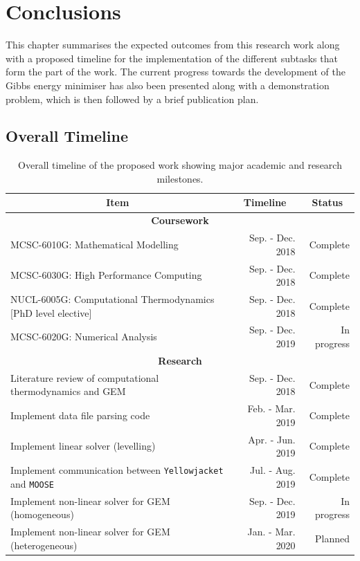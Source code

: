 \chapter{Conclusions} \label{chap:conclusions}


	This chapter summarises the expected outcomes from this research work along with a proposed timeline for the implementation of the different subtasks that form the part of the work. The current progress towards the development of the Gibbs energy minimiser has also been presented along with a demonstration problem, which is then followed by a brief publication plan.


\section{Overall Timeline}
	\begin{table}[!htbp]
		\caption{Overall timeline of the proposed work showing major academic and research milestones.}
		\centering
  		\begin{tabular}{@{}l r r@{}}
		\toprule
		\multicolumn{1}{c}{\textbf{Item}} & \multicolumn{1}{c}{\textbf{Timeline}} & \multicolumn{1}{c}{\textbf{Status}}\\
		\midrule
		\multicolumn{3}{c}{\textbf{Coursework}}\\
		\midrule
		MCSC-6010G: Mathematical Modelling & Sep. - Dec. 2018 & Complete\\
		MCSC-6030G: High Performance Computing & Sep. - Dec. 2018 & Complete\\
		NUCL-6005G: Computational Thermodynamics [PhD level elective] & Sep. - Dec. 2018 & Complete\\
		MCSC-6020G: Numerical Analysis & Sep. - Dec. 2019 & In progress\\
		\midrule
		\multicolumn{3}{c}{\textbf{Research}}\\
		\midrule
		Literature review of computational thermodynamics and GEM & Sep. - Dec. 2018 & Complete\\
		Implement data file parsing code & Feb. - Mar. 2019 & Complete\\
		Implement linear solver (levelling) & Apr. - Jun. 2019 & Complete\\
		Implement communication between \texttt{Yellowjacket} and \texttt{MOOSE} & Jul. - Aug. 2019 & Complete\\
		Implement non-linear solver for GEM (homogeneous) & Sep. - Dec. 2019 & In progress\\
		Implement non-linear solver for GEM (heterogeneous) & Jan. - Mar. 2020 & Planned\\

\end{tabular}
\end{table}

